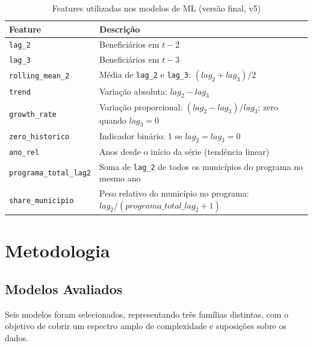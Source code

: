 \documentclass[12pt, a4paper]{article}
\begin{document}
\begin{table}[H]
  \centering
  \caption{Features utilizadas nos modelos de ML (versão final, v5)}
  \label{tab:features}
  \begin{tabular}{p{3.5cm} p{8.5cm}}
    \toprule
    \textbf{Feature}         & \textbf{Descrição} \\
    \midrule
    \texttt{lag\_2}          & Beneficiários em $t-2$ \\
    \texttt{lag\_3}          & Beneficiários em $t-3$ \\
    \texttt{rolling\_mean\_2}& Média de \texttt{lag\_2} e \texttt{lag\_3}: $(lag_2 + lag_3)/2$ \\
    \texttt{trend}           & Variação absoluta: $lag_2 - lag_3$ \\
    \texttt{growth\_rate}    & Variação proporcional: $(lag_2 - lag_3)/lag_3$; zero quando $lag_3 = 0$ \\
    \texttt{zero\_historico} & Indicador binário: 1 se $lag_2 = lag_3 = 0$ \\
    \texttt{ano\_rel}        & Anos desde o início da série (tendência linear) \\
    \texttt{programa\_total\_lag2} & Soma de \texttt{lag\_2} de todos os municípios do programa no mesmo ano \\
    \texttt{share\_municipio}& Peso relativo do município no programa: $lag_2 / (programa\_total\_lag_2 + 1)$ \\
    \bottomrule
  \end{tabular}
\end{table}

\newpage
\section{Metodologia}
\label{sec:metodologia}

\subsection{Modelos Avaliados}

Seis modelos foram selecionados, representando três famílias distintas,
com o objetivo de cobrir um espectro amplo de complexidade e suposições
sobre os dados.
\end{document}
